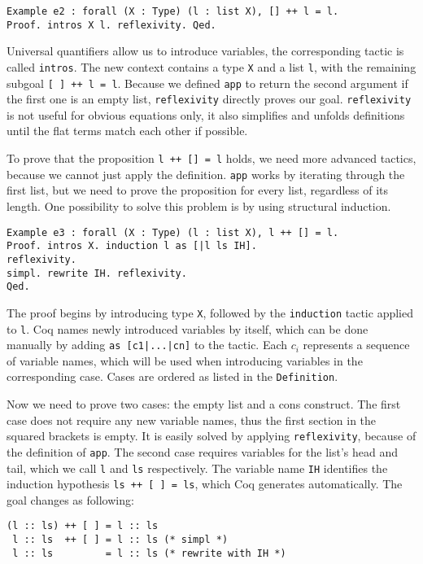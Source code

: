 \documentclass{scrreprt}
\newcommand{\coqinline}[1]{\texttt{#1}}
\begin{document}
\begin{verbatim}
Example e2 : forall (X : Type) (l : list X), [] ++ l = l.
Proof. intros X l. reflexivity. Qed.
\end{verbatim}
Universal quantifiers allow us to introduce variables, the corresponding tactic is called \coqinline{intros}. The new context contains a type \coqinline{X} and a list \coqinline{l}, with the remaining subgoal \coqinline{[ ] ++ l = l}. Because we defined \coqinline{app} to return the second argument if the first one is an empty list, \coqinline{reflexivity} directly proves our goal. \coqinline{reflexivity} is not useful for obvious equations only, it also simplifies and unfolds definitions until the flat terms match each other if possible.
\par
To prove that the proposition \coqinline{l ++ [] = l} holds, we need more advanced tactics, because we cannot just apply the definition. \coqinline{app} works by iterating through the first list, but we need to prove the proposition for every list, regardless of its length. One possibility to solve this problem is by using structural induction.
\begin{verbatim}
Example e3 : forall (X : Type) (l : list X), l ++ [] = l.
Proof. intros X. induction l as [|l ls IH].
reflexivity.
simpl. rewrite IH. reflexivity.
Qed.
\end{verbatim}
The proof begins by introducing type \coqinline{X}, followed by the \coqinline{induction} tactic applied to \coqinline{l}. Coq names newly introduced variables by itself, which can be done manually by adding \coqinline{as [c1|...|cn]} to the tactic. Each $c_{i}$ represents a sequence of variable names, which will be used when introducing variables in the corresponding case. Cases are ordered as listed in the \coqinline{Definition}.
\par
Now we need to prove two cases: the empty list and a cons construct. The first case does not require any new variable names, thus the first section in the squared brackets is empty. It is easily solved by applying \coqinline{reflexivity}, because of the definition of \coqinline{app}.
The second case requires variables for the list's head and tail, which we call \coqinline{l} and \coqinline{ls} respectively. The variable name \coqinline{IH} identifies the induction hypothesis \coqinline{ls ++ [ ] = ls}, which Coq generates automatically. The goal changes as following:
\begin{verbatim}
(l :: ls) ++ [ ] = l :: ls
 l :: ls  ++ [ ] = l :: ls (* simpl *)
 l :: ls         = l :: ls (* rewrite with IH *)
\end{verbatim}
\end{document}
